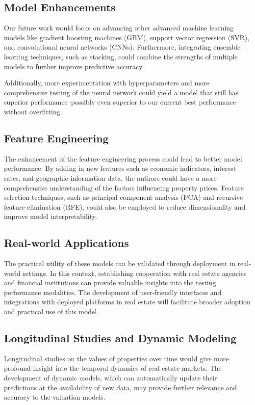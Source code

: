 \documentclass[conference, 11pt]{IEEEtran}
\begin{document}
\subsection{Model Enhancements}
Our future work would focus on advancing other advanced machine learning models like gradient boosting machines (GBM), support vector regression (SVR), and convolutional neural networks (CNNs). Furthermore, integrating ensemble learning techniques, such as stacking, could combine the strengths of multiple models to further improve predictive accuracy.

Additionally, more experimentation with hyperparameters and more comprehensive testing of the neural network could yield a model that still has superior performance--possibly even superior to our current best performance--without overfitting. 

\subsection{Feature Engineering}
The enhancement of the feature engineering process could lead to better model performance. By adding in new features such as economic indicators, interest rates, and geographic information data, the authors could have a more comprehensive understanding of the factors influencing property prices. Feature selection techniques, such as principal component analysis (PCA) and recursive feature elimination (RFE), could also be employed to reduce dimensionality and improve model interpretability.

\subsection{Real-world Applications}
The practical utility of these models can be validated through deployment in real-world settings. In this context, establishing cooperation with real estate agencies and financial institutions can provide valuable insights into the testing performance modalities. The development of user-friendly interfaces and integrations with deployed platforms in real estate will facilitate broader adoption and practical use of this model.

\subsection{Longitudinal Studies and Dynamic Modeling}
Longitudinal studies on the values of properties over time would give more profound insight into the temporal dynamics of real estate markets. The development of dynamic models, which can automatically update their predictions at the availability of new data, may provide further relevance and accuracy to the valuation models.
\end{document}
